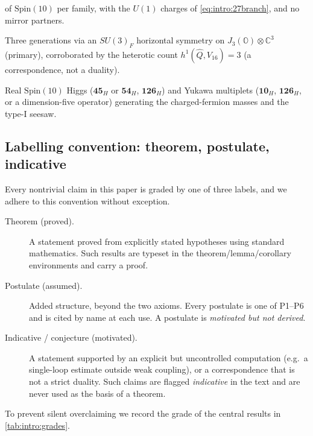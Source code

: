 \documentclass[11pt]{article}
\theoremstyle{plain}
\theoremstyle{definition}
\theoremstyle{remark}
\begin{document}
\begin{description}
    of $\mathrm{Spin}(10)$ per family, with the $U(1)$ charges of
    \eqref{eq:intro:27branch}, and no mirror partners.
  \item[\textnormal{P5} (Family symmetry).] Three generations via an
    $SU(3)_F$ horizontal symmetry on $J_3(\mathbb{O})\otimes\mathbb{C}^{3}$
    (primary), corroborated by the heterotic count
    $h^{1}(\hat Q,V_{16})=3$ (a correspondence, not a duality).
  \item[\textnormal{P6} (GUT-Higgs / Yukawa sector).] Real $\mathrm{Spin}(10)$
    Higgs ($\mathbf{45}_H$ or $\mathbf{54}_H$, $\mathbf{126}_H$) and Yukawa
    multiplets ($\mathbf{10}_H$, $\mathbf{126}_H$, or a dimension-five operator)
    generating the charged-fermion masses and the type-I seesaw.
\end{description}

\subsection{Labelling convention: theorem, postulate, indicative}
\label{sec:intro:convention}

Every nontrivial claim in this paper is graded by one of three labels, and we
adhere to this convention without exception.
\begin{description}
  \item[Theorem (proved).] A statement proved from explicitly stated hypotheses
    using standard mathematics. Such results are typeset in the
    \textsf{theorem}/\textsf{lemma}/\textsf{corollary} environments and carry a
    proof.
  \item[Postulate (assumed).] Added structure, beyond the two axioms. Every
    postulate is one of \textnormal{P1--P6} and is cited by name at each use. A
    postulate is \emph{motivated but not derived}.
  \item[Indicative / conjecture (motivated).] A statement supported by an
    explicit but uncontrolled computation (e.g.\ a single-loop estimate outside
    weak coupling), or a correspondence that is not a strict duality. Such
    claims are flagged \emph{indicative} in the text and are never used as the
    basis of a theorem.
\end{description}

\noindent To prevent silent overclaiming we record the grade of the central
results in \autoref{tab:intro:grades}.
\end{document}
